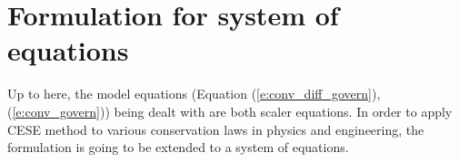 \documentclass[11pt,dvips]{article}
\numberwithin{equation}{section}
\begin{document}
\section{Formulation for system of equations}
\label{s:system_eqn}

Up to here, the model equations (Equation (\ref{e:conv_diff_govern}),
(\ref{e:conv_govern})) being dealt with are both scaler equations.
In order to apply CESE method to various conservation laws in physics
and engineering, the formulation is going to be extended to a system
of equations.
\end{document}
